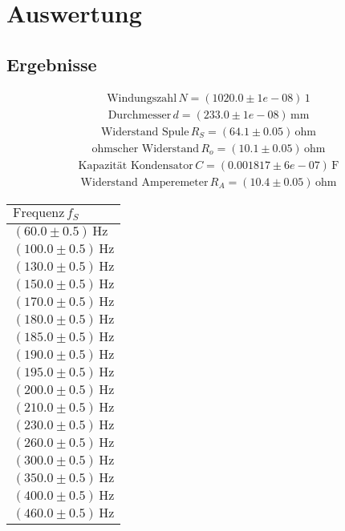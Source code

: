 \documentclass[a4paper,10pt]{scrbook}
\begin{document}
\section*{Auswertung}

\subsection*{Ergebnisse}

\begin{align*}
\text{Windungszahl}\,N = (1020.0\pm 1e-08)\,\mathrm{1}
\end{align*}
\begin{align*}
\text{Durchmesser}\,d = (233.0\pm 1e-08)\,\mathrm{mm}
\end{align*}
\begin{align*}
\text{Widerstand Spule}\,R_S = (64.1\pm 0.05)\,\mathrm{ohm}
\end{align*}
\begin{align*}
\text{ohmscher Widerstand}\,R_o = (10.1\pm 0.05)\,\mathrm{ohm}
\end{align*}
\begin{align*}
\text{Kapazität Kondensator}\,C = (0.001817\pm 6e-07)\,\mathrm{F}
\end{align*}
\begin{align*}
\text{Widerstand Amperemeter}\,R_A = (10.4\pm 0.05)\,\mathrm{ohm}
\end{align*}
\begin{table}[htb]
\centering
\begin{tabular}{|l|}
\hline
$\text{Frequenz}\,f_S$  \\ \hline
$(60.0\pm 0.5)\,\mathrm{Hz}$
\\ \hline
$(100.0\pm 0.5)\,\mathrm{Hz}$
\\ \hline
$(130.0\pm 0.5)\,\mathrm{Hz}$
\\ \hline
$(150.0\pm 0.5)\,\mathrm{Hz}$
\\ \hline
$(170.0\pm 0.5)\,\mathrm{Hz}$
\\ \hline
$(180.0\pm 0.5)\,\mathrm{Hz}$
\\ \hline
$(185.0\pm 0.5)\,\mathrm{Hz}$
\\ \hline
$(190.0\pm 0.5)\,\mathrm{Hz}$
\\ \hline
$(195.0\pm 0.5)\,\mathrm{Hz}$
\\ \hline
$(200.0\pm 0.5)\,\mathrm{Hz}$
\\ \hline
$(210.0\pm 0.5)\,\mathrm{Hz}$
\\ \hline
$(230.0\pm 0.5)\,\mathrm{Hz}$
\\ \hline
$(260.0\pm 0.5)\,\mathrm{Hz}$
\\ \hline
$(300.0\pm 0.5)\,\mathrm{Hz}$
\\ \hline
$(350.0\pm 0.5)\,\mathrm{Hz}$
\\ \hline
$(400.0\pm 0.5)\,\mathrm{Hz}$
\\ \hline
$(460.0\pm 0.5)\,\mathrm{Hz}$
\\ \hline
\end{tabular}
\end{table}
\end{document}
